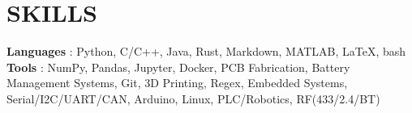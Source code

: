 \section{SKILLS}
\begin{itemize}[leftmargin=0in, label={}]
    \small{\item{
                    \textbf{Languages} {: Python, C/C++, Java, Rust, Markdown, MATLAB, \LaTeX, bash}\vspace{2pt} \\
                    \textbf{Tools}     {: NumPy, Pandas, Jupyter, Docker, PCB Fabrication, Battery Management Systems, Git, 3D Printing, Regex, Embedded Systems, Serial/I2C/UART/CAN, Arduino, Linux, PLC/Robotics, RF(433/2.4/BT)}
              }}
\end{itemize}